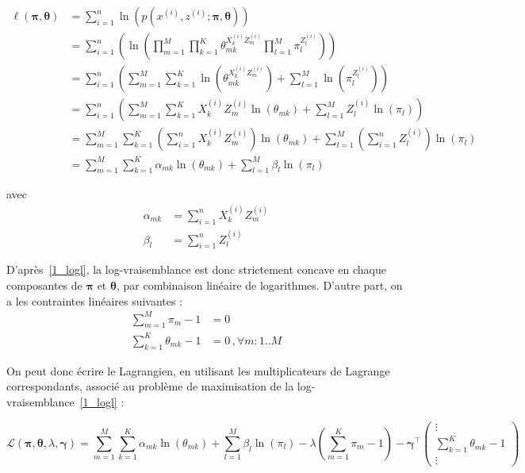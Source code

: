 \documentclass[12pt,a4paper,onecolumn]{article}
\begin{document}
\begin{equation}
	\begin{split}
		\ell( \bm{\pi}, \bm{\theta}) & = \sum_{i = 1}^n \ln(p(x^{(i)}, z^{(i)} ; \bm{\pi}, \bm{\theta}))                                                                        \\
		& = \sum_{i = 1}^n\left(\ln\left(\prod_{m=1}^M \prod_{k=1}^K \theta_{mk}^{X_k^{(i)} Z_m^{(i)}} \prod_{l = 1}^M\pi_l^{Z_l^{(i)}}\right)\right)                   \\
		& = \sum_{i = 1}^n\left(\sum_{m=1}^M \sum_{k=1}^K \ln(\theta_{mk}^{X_k^{(i)} Z_m^{(i)}}) + \sum_{l = 1}^M\ln(\pi_l^{Z_l^{(i)}})\right)                          \\
		& = \sum_{i = 1}^n\left(\sum_{m=1}^M \sum_{k=1}^K X_k^{(i)} Z_m^{(i)}\ln(\theta_{mk}) + \sum_{l = 1}^M {Z_l^{(i)}}\ln(\pi_l)\right)                             \\
		& = \sum_{m=1}^M \sum_{k=1}^K \left(\sum_{i = 1}^n X_k^{(i)} Z_m^{(i)}\right)\ln(\theta_{mk}) + \sum_{l = 1}^M\left(\sum_{i = 1}^n {Z_l^{(i)}}\right)\ln(\pi_l) \\
		& = \sum_{m=1}^M \sum_{k=1}^K \alpha_{mk}\ln(\theta_{mk}) + \sum_{l = 1}^M \beta_l\ln(\pi_l)
	\end{split}
	\label{1_logl}
\end{equation}

avec
\begin{align*}
	\alpha_{mk} & = \sum_{i = 1}^n X_k^{(i)} Z_m^{(i)} \\
	\beta_l     & = \sum_{i = 1}^n {Z_l^{(i)}}
\end{align*}

D'après~\eqref{1_logl}, la log-vraisemblance est donc strictement concave en chaque composantes de \(\bm{\pi}\) et \(\bm{\theta}\), par combinaison linéaire de logarithmes. D'autre part, on a les contraintes linéaires suivantes :
\begin{equation}
	\begin{split}
		\sum_{m = 1}^M \pi_m - 1 &= 0\\
		\sum_{k = 1}^K \theta_{mk} - 1 &= 0 \,,  \forall m : 1..M
	\end{split}
\end{equation}

On peut donc écrire le Lagrangien, en utilisant les multiplicateurs de Lagrange correspondants, associé au problème de maximisation de la log-vraisemblance~\eqref{1_logl} :

\begin{equation}
	\mathcal{L}(\bm{\pi}, \bm{\theta}, \lambda, \bm{\gamma}) = \sum_{m=1}^M \sum_{k=1}^K \alpha_{mk}\ln(\theta_{mk}) + \sum_{l = 1}^M \beta_l\ln(\pi_l) - \lambda\left(\sum_{m = 1}^K \pi_m - 1\right) - \bm{\gamma}^\intercal \begin{pmatrix}
		\vdots                         \\
		\sum_{k = 1}^K \theta_{mk} - 1 \\
		\vdots
	\end{pmatrix}
	\label{1_lagrang}
\end{equation}
\end{document}
